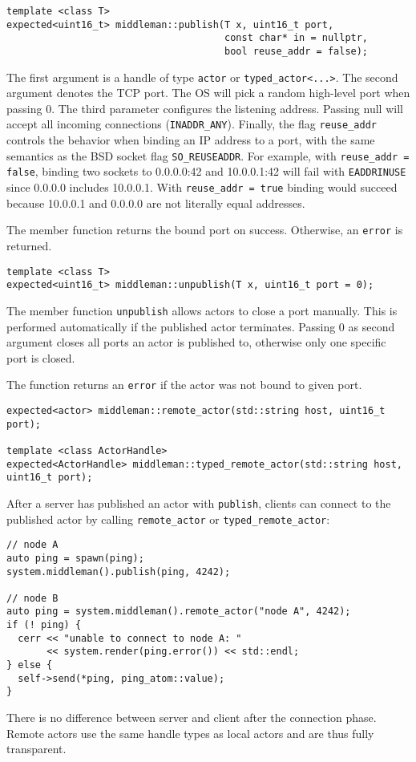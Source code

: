 \begin{lstlisting}
template <class T>
expected<uint16_t> middleman::publish(T x, uint16_t port,
                                      const char* in = nullptr,
                                      bool reuse_addr = false);
\end{lstlisting}

The first argument is a handle of type \lstinline^actor^ or \lstinline^typed_actor<...>^. The second argument denotes the TCP port. The OS will pick a random high-level port when passing 0. The third parameter configures the listening address. Passing null will accept all incoming connections (\lstinline^INADDR_ANY^). Finally, the flag \lstinline^reuse_addr^ controls the behavior when binding an IP address to a port, with the same semantics as the BSD socket flag \lstinline^SO_REUSEADDR^.
For example, with \lstinline^reuse_addr = false^, binding two sockets to 0.0.0.0:42 and 10.0.0.1:42 will fail with \texttt{EADDRINUSE} since 0.0.0.0 includes 10.0.0.1. 
With \lstinline^reuse_addr = true^ binding would succeed because 10.0.0.1 and
0.0.0.0 are not literally equal addresses.

The member function returns the bound port on success. Otherwise, an \lstinline^error^  is returned.

\begin{lstlisting}
template <class T>
expected<uint16_t> middleman::unpublish(T x, uint16_t port = 0);
\end{lstlisting}

The member function \lstinline^unpublish^ allows actors to close a port manually. This is performed automatically if the published actor terminates. Passing 0 as second argument closes all ports an actor is published to, otherwise only one specific port is closed.

The function returns an \lstinline^error^  if the actor was not bound to given port.

\clearpage
\begin{lstlisting}
expected<actor> middleman::remote_actor(std::string host, uint16_t port);

template <class ActorHandle>
expected<ActorHandle> middleman::typed_remote_actor(std::string host, uint16_t port);
\end{lstlisting}

After a server has published an actor with \lstinline^publish^, clients can connect to the published actor by calling \lstinline^remote_actor^ or \lstinline^typed_remote_actor^:

\begin{lstlisting}
// node A
auto ping = spawn(ping);
system.middleman().publish(ping, 4242);

// node B
auto ping = system.middleman().remote_actor("node A", 4242);
if (! ping) {
  cerr << "unable to connect to node A: "
       << system.render(ping.error()) << std::endl;
} else {
  self->send(*ping, ping_atom::value);
}
\end{lstlisting}

There is no difference between server and client after the connection phase. Remote actors use the same handle types as local actors and are thus fully transparent.
